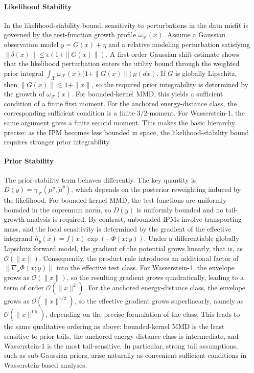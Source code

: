 \documentclass[twoside,11pt]{article}
\begin{document}
\paragraph{Likelihood Stability} In the likelihood-stability bound, sensitivity to perturbations in the data misfit is governed by the test-function growth profile $\omega_{\mathcal{F}}(x)$. Assume a Gaussian observation model $y = G(x) + \eta$ and a relative modeling perturbation satisfying $\|\delta(x)\| \le \epsilon(1 + \|G(x)\|)$. A first-order Gaussian shift estimate shows that the likelihood perturbation enters the utility bound through the weighted prior integral $
\int_{\mathcal X} \omega_{\mathcal F}(x)\bigl(1+\|G(x)\|\bigr)\,\mu(dx).$
If $G$ is globally Lipschitz, then $\|G(x)\|\lesssim 1+\|x\|$, so the required prior integrability is determined by the growth of $\omega_{\mathcal F}(x)$. For bounded-kernel MMD, this yields a sufficient condition of a finite first moment. For the anchored energy-distance class, the corresponding sufficient condition is a finite $3/2$-moment. For Wasserstein-1, the same argument gives a finite second moment. This makes the basic hierarchy precise: as the IPM becomes less bounded in space, the likelihood-stability bound requires stronger prior integrability.

\noindent 

\paragraph{Prior Stability} The prior-stability term behaves differently. The key quantity is $
D(y)=\gamma_{\mathcal F}(\mu^y,\tilde\mu^y)$,
which depends on the posterior reweighting induced by the likelihood. For bounded-kernel MMD, the test functions are uniformly bounded in the supremum norm, so $D(y)$ is uniformly bounded and no tail-growth analysis is required. By contrast, unbounded IPMs involve transporting mass, and the local sensitivity is determined by the gradient of the effective integrand $h_y(x) = f(x)\exp(-\Phi(x;y))$.
Under a differentiable globally Lipschitz forward model, the gradient of the potential grows linearly, that is, as $\mathcal{O}(\|x\|)$. Consequently, the product rule introduces an additional factor of $\|\nabla_x\Phi(x;y)\|$ into the effective test class. For Wasserstein-1, the envelope grows as $\mathcal{O}(\|x\|)$, so the resulting gradient grows quadratically, leading to a term of order $\mathcal{O}(\|x\|^2)$. For the anchored energy-distance class, the envelope grows as $\mathcal{O}(\|x\|^{1/2})$, so the effective gradient grows superlinearly, namely as $\mathcal{O}(\|x\|^{1.5})$, depending on the precise formulation of the class. This leads to the same qualitative ordering as above: bounded-kernel MMD is the least sensitive to prior tails, the anchored energy-distance class is intermediate, and Wasserstein-1 is the most tail-sensitive. In particular, strong tail assumptions, such as sub-Gaussian priors, arise naturally as convenient sufficient conditions in Wasserstein-based analyses.
\end{document}
